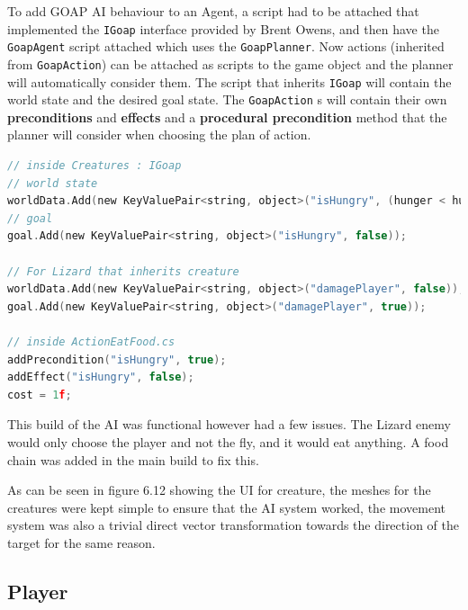 \documentclass[11pt]{report}
\begin{document}
To add GOAP AI behaviour to an Agent, a script had to be attached that implemented the \lstinline{IGoap} interface provided by Brent Owens, and then have the \lstinline{GoapAgent} script attached which uses the \lstinline{GoapPlanner}. Now actions (inherited from \lstinline{GoapAction}) can be attached as scripts to the game object and the planner will automatically consider them. The script that inherits \lstinline{IGoap} will contain the world state and the desired goal state. The \lstinline{GoapAction} s will contain their own \textbf{preconditions} and \textbf{effects} and a \textbf{procedural precondition} method that the planner will consider when choosing the plan of action. 

\begin{lstlisting}[language=c]
// inside Creatures : IGoap 
// world state
worldData.Add(new KeyValuePair<string, object>("isHungry", (hunger < hungerThreshold)));
// goal
goal.Add(new KeyValuePair<string, object>("isHungry", false));

// For Lizard that inherits creature
worldData.Add(new KeyValuePair<string, object>("damagePlayer", false)); 
goal.Add(new KeyValuePair<string, object>("damagePlayer", true));
 
// inside ActionEatFood.cs
addPrecondition("isHungry", true);
addEffect("isHungry", false);
cost = 1f;
\end{lstlisting}

This build of the AI was functional however had a few issues. The Lizard enemy would only choose the player and not the fly, and it would eat anything. A food chain was added in the main build to fix this.

As can be seen in figure 6.12 showing the UI for creature, the meshes for the creatures were kept simple to ensure that the AI system worked, the movement system was also a trivial direct vector transformation towards the direction of the target for the same reason.



\subsection{Player}
\end{document}
